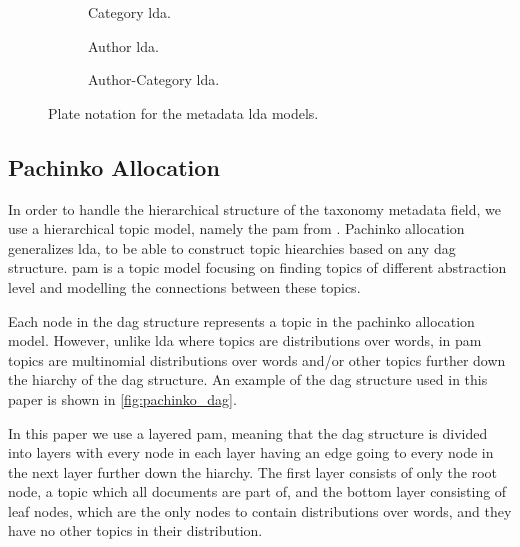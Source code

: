 \begin{figure*}[ht]
	\centering
	\begin{subfigure}{0.25\textwidth}
		\centering
		\resizebox{\textwidth}{!}{%
		
		}
		\caption{Category \gls{lda}.}
		\label{fig:category_lda}
	\end{subfigure}
	\hspace{2em}
	\begin{subfigure}{0.25\textwidth}
		\centering
		\resizebox{\textwidth}{!}{%
			
		}
		\caption{Author \gls{lda}.}
		\label{fig:author_lda}
	\end{subfigure}
	\hspace{2em}
	\begin{subfigure}{0.25\textwidth}
		\centering
		\resizebox{\textwidth}{!}{%
			
		}
		\caption{Author-Category \gls{lda}.}
		\label{fig:author_category_lda}
\end{subfigure}
	\caption{Plate notation for the metadata \gls{lda} models.}
	\label{fig:metadata_lda}
\end{figure*}

\subsection{Pachinko Allocation}
In order to handle the hierarchical structure of the taxonomy metadata field, we use a hierarchical topic model, namely the \acrlong{pam} from \citet{li2006pachinko}.
Pachinko allocation generalizes \gls{lda}, to be able to construct topic hiearchies based on any \gls{dag} structure.
\gls{pam} is a topic model focusing on finding topics of different abstraction level and modelling the connections between these topics. 

Each node in the \gls{dag} structure represents a topic in the pachinko allocation model. However, unlike \gls{lda} where topics are distributions over words, in \gls{pam} topics are multinomial distributions over words and/or other topics further down the hiarchy of the  \gls{dag} structure.
An example of the dag structure used in this paper is shown in \autoref{fig:pachinko_dag}.


In this paper we use a layered \gls{pam}, meaning that the \gls{dag} structure is divided into layers with every node in each layer having an edge going to every node in the next layer further down the hiarchy.
The first layer consists of only the root node, a topic which all documents are part of, and the bottom layer consisting of leaf nodes, which are the only nodes to contain distributions over words, and they have no other topics in their distribution.

